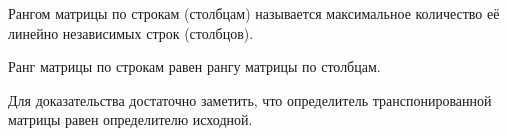Рангом матрицы по строкам (столбцам) называется максимальное количество её линейно независимых строк (столбцов).

\begin{consequent}
Ранг матрицы по строкам равен рангу матрицы по столбцам.
\end{consequent}%
Для доказательства достаточно заметить, что определитель транспонированной матрицы равен определителю исходной.